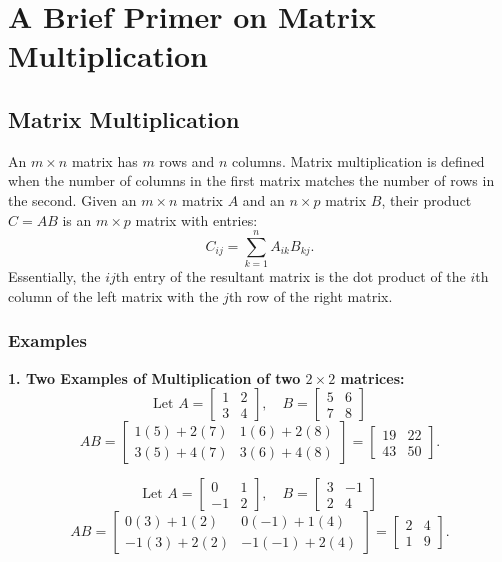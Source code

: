 \setcounter{chapter}{1}
\chapter*{A Brief Primer on Matrix Multiplication}
\addtocounter{chapter}{1} %

\section{Matrix Multiplication}
An $m\times n$ matrix has $m$ rows and $n$ columns. Matrix multiplication is defined when the number of columns in the first matrix matches the number of rows in the second. Given an \( m \times n \) matrix \( A \) and an \( n \times p \) matrix \( B \), their product \( C = AB \) is an \( m \times p \) matrix with entries:
\[
C_{ij} = \sum_{k=1}^{n} A_{ik} B_{kj}.
\]
Essentially, the $ij$th entry of the resultant matrix is the dot product of the $i$th column of the left matrix  with the $j$th row of the right matrix.
\subsection{Examples}

\textbf{1. Two Examples of Multiplication of two \( 2 \times 2 \) matrices:}
\[
\text{Let }A = \begin{bmatrix} 1 & 2 \\ 3 & 4 \end{bmatrix}, \quad 
B = \begin{bmatrix} 5 & 6 \\ 7 & 8 \end{bmatrix}
\]
\[
AB = \begin{bmatrix} 1(5) + 2(7) & 1(6) + 2(8) \\ 3(5) + 4(7) & 3(6) + 4(8) \end{bmatrix}
= \begin{bmatrix} 19 & 22 \\ 43 & 50 \end{bmatrix}.
\]

\[
\text{Let }A = \begin{bmatrix} 0 & 1 \\ -1 & 2 \end{bmatrix}, \quad 
B = \begin{bmatrix} 3 & -1 \\ 2 & 4 \end{bmatrix}
\]
\[
AB = \begin{bmatrix} 0(3) + 1(2) & 0(-1) + 1(4) \\ -1(3) + 2(2) & -1(-1) + 2(4) \end{bmatrix}
= \begin{bmatrix} 2 & 4 \\ 1 & 9 \end{bmatrix}.
\]

